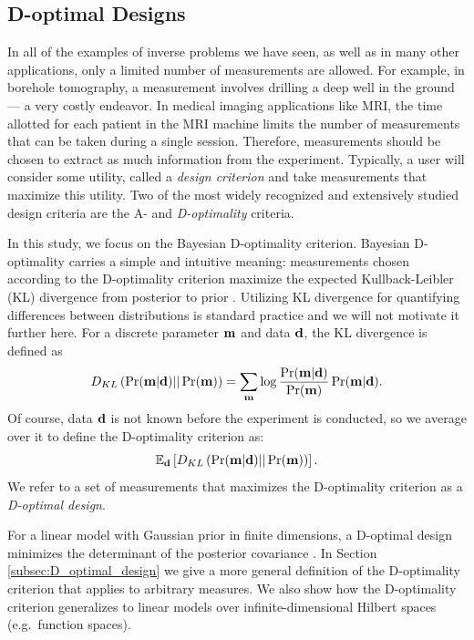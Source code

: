 \subsection{D-optimal Designs}\label{subsec:D}
In all of the examples of inverse problems we have seen, as well as in
many other applications, only a limited number of measurements are
allowed. For example, in borehole tomography, a measurement involves
drilling a deep well in the ground --- a very costly endeavor. In
medical imaging applications like MRI, the time allotted for each
patient in the MRI machine limits the number of measurements that can
be taken during a single session. Therefore, measurements should be
chosen to extract as much information from the experiment. Typically,
a user will consider some utility, called a \emph{design criterion}
and take measurements that maximize this utility. Two of the most
widely recognized and extensively studied design criteria are the A-
and \emph{D-optimality} criteria.

In this study, we focus on the Bayesian D-optimality
criterion. Bayesian D-optimality carries a simple and intuitive
meaning: measurements chosen according to the D-optimality criterion
maximize the expected Kullback-Leibler (KL) divergence from posterior
to prior \cite{chaloner1995, AlexanderianGloorGhattas14,
  CoverThomas91}. Utilizing KL divergence for quantifying differences
between distributions is standard practice and we will not motivate it
further here. For a discrete parameter $\mathbf{m}$ and data $\mathbf{d}$, the
KL divergence is defined as
\begin{equation}\label{eq:basic_KL}
  D_{KL}\left (\Pr(\param|\data)||\Pr(\param)\right ) =  \sum_{\param} \log
  \frac{\Pr(\param|\data)}{\Pr(\param)} \Pr(\param|\data). 
\end{equation}
Of course, data $\mathbf{d}$ is not known before the experiment is
conducted, so we average over it to define the D-optimality criterion
as:
\begin{equation*}
  \mathbb{E}_{\data}\left [ D_{KL}\left (\Pr(\param|\data)||\Pr(\param)\right ) \right ].
\end{equation*}
We refer to a set of measurements that maximizes the D-optimality
criterion as a \emph{D-optimal design}.

For a linear model with Gaussian prior in finite dimensions, a
D-optimal design minimizes the determinant of the posterior covariance
\cite{chaloner1995}. In Section \ref{subsec:D_optimal_design} we give
a more general definition of the D-optimality criterion that applies
to arbitrary measures. We also show how the D-optimality criterion
generalizes to linear models over infinite-dimensional Hilbert spaces
(e.g.~function spaces).

